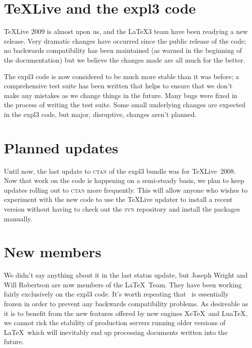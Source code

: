 \documentclass{ltnews}
\begin{document}
\maketitle

\section{\TeX Live and the \textsf{expl3} code}

\TeX Live 2009 is almost upon us, and the \LaTeX3 team have been readying a new release. Very dramatic changes have occurred since the public release of the code; no backwards compatibility has been maintained (as warned in the beginning of the documentation) but we believe the changes made are all much for the better.

The \textsf{expl3} code is now considered to be much more stable than it was before; a comprehensive test suite has been written that helps to ensure that we don't make any mistakes as we change things in the future. Many bugs were fixed in the process of writing the test suite. Some small underlying changes are expected in the \textsf{expl3} code, but major, disruptive, changes aren't planned.

\section{Planned updates}

Until now, the last update to \textsc{ctan} of the \textsf{expl3} bundle was for \TeX Live~2008. Now that work on the code is happening on a semi-steady basis, we plan to keep updates rolling out to \textsc{ctan} more frequently. This will allow anyone who wishes to experiment with the new code to use the \TeX Live updater to install a recent version without having to check out the \textsc{svn} repository and install the packages manually.

\section{New members}

We didn't say anything about it in the last status update, but Joseph Wright and Will Robertson are now members of the \LaTeX\ Team. They have been working fairly exclusively on the \textsf{expl3} code. It's worth repeating that \LaTeXe\ is essentially frozen in order to prevent any backwards compatibility problems. As desireable as it is to benefit from the new features offered by new engines Xe\TeX\ and Lua\TeX, we cannot risk the stability of production servers running older versions of \LaTeX\ which will inevitably end up processing documents written into the future.
\end{document}

